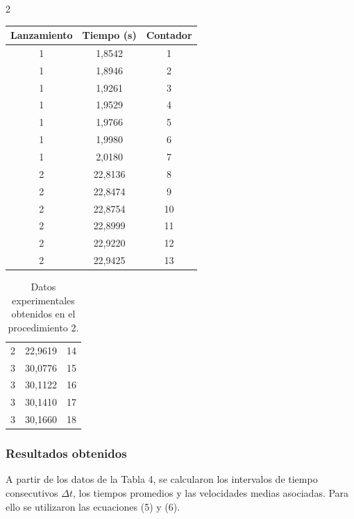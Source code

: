 \documentclass[11pt,letterpaper]{article}
\begin{document}
\begin{multicols}{2}
\begin{table}[H]
\centering
\small
\begin{tabular}{ccc}
\toprule
Lanzamiento & Tiempo (s) & Contador \\
\midrule
1 & 1,8542 & 1 \\
1 & 1,8946 & 2 \\
1 & 1,9261 & 3 \\
1 & 1,9529 & 4 \\
1 & 1,9766 & 5 \\
1 & 1,9980 & 6 \\
1 & 2,0180 & 7 \\
2 & 22,8136 & 8 \\
2 & 22,8474 & 9 \\
2 & 22,8754 & 10 \\
2 & 22,8999 & 11 \\
2 & 22,9220 & 12 \\
2 & 22,9425 & 13 \\
\end{tabular}
\end{table}

\begin{table}[H]
\centering
\small
\begin{tabular}{ccc}
2 & 22,9619 & 14 \\
3 & 30,0776 & 15 \\
3 & 30,1122 & 16 \\
3 & 30,1410 & 17 \\
3 & 30,1660 & 18 \\
\bottomrule
\end{tabular}
\caption{Datos experimentales obtenidos en el procedimiento 2.}
\end{table}

\subsubsection{Resultados obtenidos}

A partir de los datos de la Tabla 4, se calcularon los intervalos de tiempo consecutivos $\Delta t$, los tiempos promedios y las velocidades medias asociadas. Para ello se utilizaron las ecuaciones (5) y (6).


\end{multicols}
\end{document}
